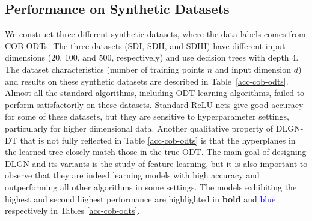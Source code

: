 \documentclass{article} %
\renewcommand{\>}{{\rightarrow}}
\renewcommand{\=}{\stackrel{\triangle}{=}}
\newcommand{\0}{{\mathbf 0}}
\begin{document}
\subsection{Performance on Synthetic Datasets}\label{sec:sd}


We construct three different synthetic datasets, where the data labels comes from COB-ODTs. The three datasets (SDI, SDII, and SDIII) have different input dimensions (20, 100, and 500, respectively) and use decision trees with depth 4. The dataset characteristics (number of training points $n$ and input dimension $d$) and results on these synthetic datasets are described in Table~\ref{acc-cob-odts}. Almost all the standard algorithms, including ODT learning algorithms, failed to perform satisfactorily on these datasets. Standard ReLU nets give good accuracy for some of these datasets, but they are sensitive to hyperparameter settings, particularly for higher dimensional data. Another qualitative property of DLGN-DT that is not fully reflected in Table \ref{acc-cob-odts} is that the hyperplanes in the learned tree closely match those in the true ODT. The main goal of designing DLGN and its variants is the study of feature learning, but it is also important to observe that they are indeed learning models with high accuracy and outperforming all other algorithms in some settings. The models exhibiting the highest and second highest performance are highlighted in \textbf{bold} and \textcolor{blue}{blue} respectively in Tables \ref{acc-cob-odts}.
\end{document}

